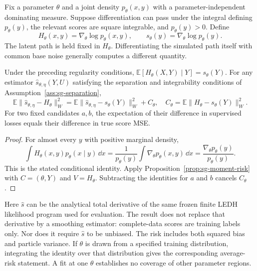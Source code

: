 Fix a parameter $\theta$ and a joint density $p_\theta(x,y)$ with a
parameter-independent dominating measure. Suppose differentiation can pass
under the integral defining $p_\theta(y)$, the relevant scores are square
integrable, and $p_\theta(y)>0$. Define
\begin{equation}
 H_\theta(x,y)=\nabla_\theta\log p_\theta(x,y),\qquad
 s_\theta(y)=\nabla_\theta\log p_\theta(y).
\label{eq:sg-score-definitions}
\end{equation}
The latent path is held fixed in $H_\theta$. Differentiating the simulated
path itself with common base noise generally computes a different quantity.

\begin{proposition}
\label{prop:sg-score-risk}
Under the preceding regularity conditions,
$\mathbb E[H_\theta(X,Y)\mid Y]=s_\theta(Y)$. For any estimator
$\widehat s_{\theta,\eta}(Y,U)$ satisfying the separation and integrability
conditions of Assumption~\ref{ass:sg-separation},
\begin{equation}
 \mathbb E\|\widehat s_{\theta,\eta}-H_\theta\|_W^2
 =\mathbb E\|\widehat s_{\theta,\eta}-s_\theta(Y)\|_W^2+C_\theta,
 \quad C_\theta=\mathbb E\|H_\theta-s_\theta(Y)\|_W^2.
\label{eq:sg-score-risk}
\end{equation}
For two fixed candidates $a,b$, the expectation of their difference in
supervised losses equals their difference in true score MSE.
\end{proposition}
\begin{proof}
For almost every $y$ with positive marginal density,
\[
 \int H_\theta(x,y)p_\theta(x\mid y)\,\dd x
 =\frac{1}{p_\theta(y)}\int\nabla_\theta p_\theta(x,y)\,\dd x
 =\frac{\nabla_\theta p_\theta(y)}{p_\theta(y)}.
\]
This is the stated conditional identity. Apply
Proposition~\ref{prop:sg-moment-risk} with $C=(\theta,Y)$ and $V=H_\theta$.
Subtracting the identities for $a$ and $b$ cancels $C_\theta$.
\end{proof}

Here $\widehat s$ can be the analytical total derivative of the same frozen
finite LEDH likelihood program used for evaluation. The result does not
replace that derivative by a smoothing estimator: complete-data scores are
training labels only. Nor does it require $\widehat s$ to be unbiased.
The risk includes both squared bias and particle variance. If $\theta$ is
drawn from a specified training distribution, integrating the identity over
that distribution gives the corresponding average-risk statement. A fit at
one $\theta$ establishes no coverage of other parameter regions.

